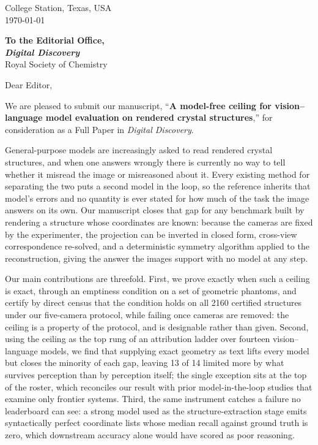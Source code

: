 \documentclass[11pt]{article}
\begin{document}
\begin{flushright}
College Station, Texas, USA\\
\today
\end{flushright}

\textbf{To the Editorial Office, \\ \textit{Digital Discovery}}\\
Royal Society of Chemistry

Dear Editor,

We are pleased to submit our manuscript, ``\textbf{A model-free ceiling for vision--language model evaluation on rendered crystal
structures},'' for consideration as a Full Paper in
\textit{Digital Discovery}.

General-purpose models are increasingly asked to read rendered crystal structures, and when one answers
wrongly there is currently no way to tell whether it misread the image or misreasoned about it. Every
existing method for separating the two puts a second model in the loop, so the reference inherits that
model's errors and no quantity is ever stated for how much of the task the image answers on its own. Our
manuscript closes that gap for any benchmark built by rendering a structure whose coordinates are known:
because the cameras are fixed by the experimenter, the projection can be inverted in closed form,
cross-view correspondence re-solved, and a deterministic symmetry algorithm applied to the reconstruction,
giving the answer the images support with no model at any step.

Our main contributions are threefold. First, we prove exactly when such a ceiling is exact, through an
emptiness condition on a set of geometric phantoms, and certify by direct census that the condition holds on
all 2160 certified structures under our five-camera protocol, while failing once cameras are removed: the
ceiling is a property of the protocol, and is designable rather than given. Second, using the ceiling as the
top rung of an attribution ladder over fourteen vision--language models, we find that supplying exact
geometry as text lifts every model but closes the minority of each gap, leaving 13 of 14 limited more by
what survives perception than by perception itself; the single exception sits at the top of the roster,
which reconciles our result with prior model-in-the-loop studies that examine only frontier systems. Third,
the same instrument catches a failure no leaderboard can see: a strong model used as the structure-extraction
stage emits syntactically perfect coordinate lists whose median recall against ground truth is zero, which
downstream accuracy alone would have scored as poor reasoning.
\end{document}

